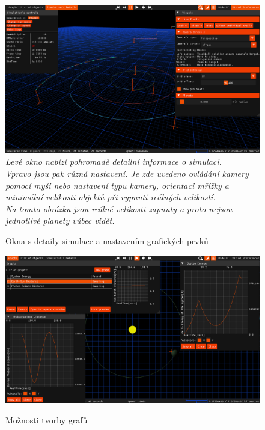 \begin{landscape}
\begin{figure}[ht]
	\caption{Okna s detaily simulace a nastavením grafických prvků}
	\centering
	\includegraphics[width=\linewidth,keepaspectratio]{Figs/SimPropsVisualPrefs_notEdited}\\
	\textit{Levé okno nabízí pohromadě detailní informace o simulaci.\\
	Vpravo jsou pak různá nastavení. Je zde uvedeno ovládání kamery pomocí myši nebo nastavení typu kamery, orientaci mřížky a minimální velikosti objektů při vypnutí reálných velikostí.\\ Na tomto obrázku jsou reálné velikosti zapnuty a proto nejsou jednotlivé planety vůbec vidět.}
\end{figure}

\begin{figure}[ht]
	\caption{Možnosti tvorby grafů}
	\centering
	\includegraphics[width=\linewidth,keepaspectratio]{Figs/Graphs}\\
\end{figure}


\end{landscape}
